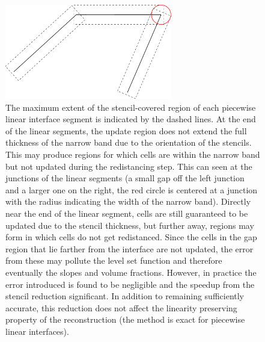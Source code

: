 \documentclass[preprint,12pt]{Definitions/elsarticle}
\begin{document}
\begin{figure}[H]
	\centering
	\includegraphics[width=0.65\textwidth]{stencilgap.eps}
	\caption{The maximum extent of the stencil-covered region of each piecewise linear interface segment is indicated by the dashed lines. At the end of the linear segments, the update region does not extend the full thickness of the narrow band due to the orientation of the stencils. This may produce regions for which cells are within the narrow band but not updated during the redistancing step. This can seen at the junctions of the linear segments (a small gap off the left junction and a larger one on the right, the red circle is centered at a junction with the radius indicating the width of the narrow band). Directly near the end of the linear segment, cells are still guaranteed to be updated due to the stencil thickness, but further away, regions may form in which cells do not get redistanced. Since the cells in the gap region that lie farther from the interface are not updated, the error from these may pollute the level set function and therefore eventually the slopes and volume fractions. However, in practice the error introduced is found to be negligible and the speedup from the stencil reduction significant. In addition to remaining sufficiently accurate, this reduction does not affect the linearity preserving property of the reconstruction (the method is exact for piecewise linear interfaces).}
	\label{fig:stencilorientation}
\end{figure}   

\FloatBarrier
\end{document}
